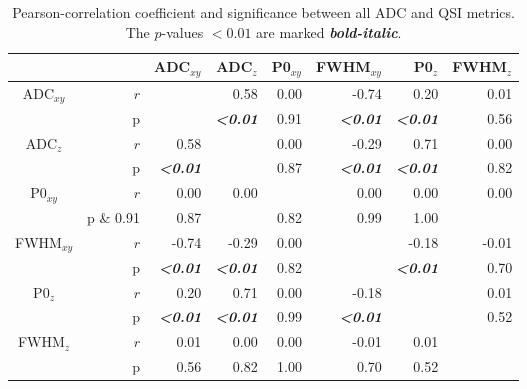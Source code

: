 \begin{table}[H]
\begin{captionframe}
    \caption[Pearson-correlation coefficient and significance between all ADC and QSI metrics.]{Pearson-correlation coefficient and significance between all ADC and QSI metrics. The $p$-values $<0.01$ are marked \textbf\emph{bold-italic}.}
    \label{tab:chapter5 exp1 correlations}
\end{captionframe}
\begin{tableframe}
\centering
	 \begin{adjustbox}{width=0.8\textwidth,keepaspectratio}
	 \begin{minipage}{\textwidth}
	 \centering
	 \begin{tabular}{rrrrrrrr}
	    \addlinespace
	    \toprule
	          &       & ADC$_{xy}$  & ADC$_{z}$  & P0$_{xy}$   & FWHM$_{xy}$   & P0$_{z}$   & FWHM$_{z}$ \\
	    \midrule
	    \multicolumn{1}{c}{\multirow{2}[0]{*}{ADC$_{xy}$}} & $\mathit{r}$   &       & 0.58  & 0.00  & -0.74 & 0.20  & 0.01 \\
	    \multicolumn{1}{c}{} & {p} & {} & {\textbf{\emph{<0.01}}} & {0.91} & {\textbf{\emph{<0.01}}} & {\textbf{\emph{<0.01}}} & {0.56} \\[2.0ex]
	    \multicolumn{1}{c}{\multirow{2}[0]{*}{ADC$_{z}$}} & $\mathit{r}$   & 0.58  &       & 0.00  & -0.29 & 0.71  & 0.00 \\
	    \multicolumn{1}{c}{} & {p} & {\textbf{\emph{<0.01}}} & {} & {0.87} & {\textbf{\emph{<0.01}}} & {\textbf{\emph{<0.01}}} & {0.82} \\[2.0ex]
	    \multicolumn{1}{c}{\multirow{2}[0]{*}{P0$_{xy}$}} & $\mathit{r}$   & 0.00  & 0.00  &       & 0.00  & 0.00  & 0.00 \\
	    \multicolumn{1}{c}{} & {p} \& {0.91} & {0.87} & {} & {0.82} & {0.99} & {1.00} \\[2.0ex]
	    \multicolumn{1}{c}{\multirow{2}[0]{*}{FWHM$_{xy}$}} & $\mathit{r}$   & -0.74 & -0.29 & 0.00  &       & -0.18 & -0.01 \\
	    \multicolumn{1}{c}{} & {p} & {\textbf{\emph{<0.01}}} & {\textbf{\emph{<0.01}}} & {0.82} & {} & {\textbf{\emph{<0.01}}} & {0.70} \\[2.0ex]
	    \multicolumn{1}{c}{\multirow{2}[0]{*}{P0$_{z}$}} & $\mathit{r}$   & 0.20  & 0.71  & 0.00  & -0.18 &       & 0.01 \\
	    \multicolumn{1}{c}{} & {p} & {\textbf{\emph{<0.01}}} & {\textbf{\emph{<0.01}}} & {0.99} & \textbf{\emph{<0.01}} & {} & {0.52} \\[2.0ex]
	    \multicolumn{1}{c}{\multirow{2}[0]{*}{FWHM$_{z}$}} & $\mathit{r}$   & 0.01  & 0.00  & 0.00  & -0.01 & 0.01  &  \\
	    \multicolumn{1}{c}{} & {p} & {0.56} & {0.82} & {1.00} & {0.70} & {0.52} & {} \\
    \bottomrule
    \end{tabular}%
	\end{minipage}
	\end{adjustbox}
\end{tableframe}
\end{table}%
